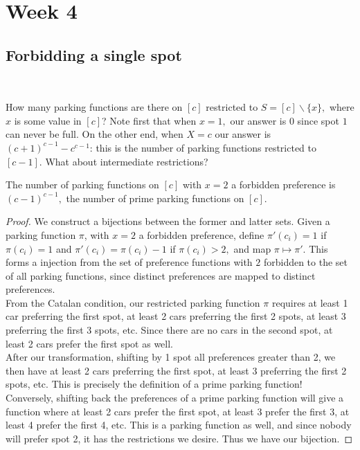 \section{Week 4}

\subsection*{Forbidding a single spot}~

How many parking functions are there on $[c]$ restricted to $S=[c]\backslash\{x\},$ where $x$ is some value in $[c]$? Note first that when $x=1,$ our answer is $0$ since spot $1$ can never be full. On the other end, when $X=c$ our answer is $(c+1)^{c-1}-c^{c-1}$: this is the number of parking functions restricted to $[c-1].$ What about intermediate restrictions?

\begin{lemma}
    The number of parking functions on $[c]$ with $x=2$ a forbidden preference is $(c-1)^{c-1},$ the number of prime parking functions on $[c].$
\end{lemma}

\begin{proof}
    We construct a bijections between the former and latter sets. Given a parking function $\pi$, with $x=2$ a forbidden preference, define $\pi'(c_i)=1$ if $\pi(c_i)=1$ and $\pi'(c_i)=\pi(c_i)-1$ if $\pi(c_i)>2,$ and map $\pi\mapsto\pi'.$ This forms a injection from the set of preference functions with $2$ forbidden to the set of all parking functions, since distinct preferences are mapped to distinct preferences.\\

    From the Catalan condition, our restricted parking function $\pi$ requires at least 1 car preferring the first spot, at least 2 cars preferring the first 2 spots, at least 3 preferring the first 3 spots, etc. Since there are no cars in the second spot, at least 2 cars prefer the first spot as well.\\

    After our transformation, shifting by 1 spot all preferences greater than 2, we then have at least 2 cars preferring the first spot, at least 3 preferring the first 2 spots, etc. This is precisely the definition of a prime parking function!\\
    
    Conversely, shifting back the preferences of a prime parking function will give a function where at least 2 cars prefer the first spot, at least 3 prefer the first 3, at least 4 prefer the first 4, etc. This is a parking function as well, and since nobody will prefer spot 2, it has the restrictions we desire. Thus we have our bijection.
\end{proof}

